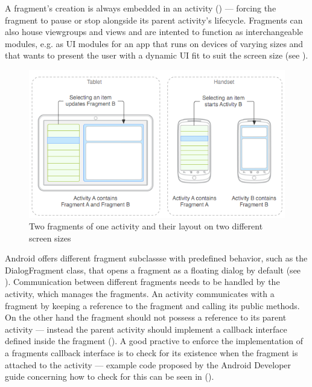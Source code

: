 A fragment's creation is always embedded in an activity (\cite{androidfragment}) --- forcing the fragment to pause or stop alongside its parent activity's lifecycle. Fragments can also house viewgroups and views and are intented to function as interchangeable modules, e.g. as \gls{UI} modules for an app that runs on devices of varying sizes and that wants to present the user with a dynamic \gls{UI} fit to suit the screen size (see ).

\begin{figure}
    \includegraphics[width=1.0\linewidth]{images/fragments.png}
   	\caption[Two fragments of one activity and their layout on two different screen sizes. \protect{}]{Two fragments of one activity and their layout on two different screen sizes} 
   	\label{fig:fragments_uimodules} 
\end{figure}

Android offers different fragment subclassse with predefined behavior, such as the DialogFragment class, that opens a fragment as a floating dialog by default (see ).  Communication between different fragments needs to be handled by the activity, which manages the fragments. An activity communicates with a fragment by keeping a reference to the fragment and calling its public methods. On the other hand the fragment should not possess a reference to its parent activity --- instead the parent activity should implement a callback interface defined inside the fragment (\cite{fragment_event_callback}). A good practive to enforce the implementation of a fragments callback interface is to check for its existence when the fragment is attached to the activity --- example code proposed by the Android Developer guide concerning how to check for this can be seen in  (\cite{fragment_event_callback}).

